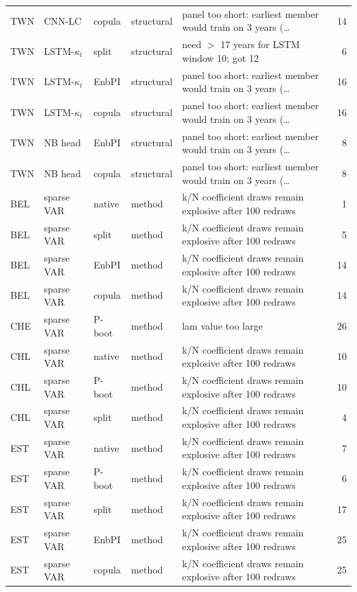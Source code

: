 {\begin{longtable}{@{}lllp{1.6cm}p{6.2cm}r@{}}
TWN & CNN-LC & copula & structural & panel too short: earliest member would train on 3 years (\ldots & 14 \\
TWN & LSTM-$\kappa_t$ & split & structural & need $>$ 17 years for LSTM window 10; got 12 & 6 \\
TWN & LSTM-$\kappa_t$ & EnbPI & structural & panel too short: earliest member would train on 3 years (\ldots & 16 \\
TWN & LSTM-$\kappa_t$ & copula & structural & panel too short: earliest member would train on 3 years (\ldots & 16 \\
TWN & NB head & EnbPI & structural & panel too short: earliest member would train on 3 years (\ldots & 8 \\
TWN & NB head & copula & structural & panel too short: earliest member would train on 3 years (\ldots & 8 \\
BEL & sparse VAR & native & method & k/N coefficient draws remain explosive after 100 redraws & 1 \\
BEL & sparse VAR & split & method & k/N coefficient draws remain explosive after 100 redraws & 5 \\
BEL & sparse VAR & EnbPI & method & k/N coefficient draws remain explosive after 100 redraws & 14 \\
BEL & sparse VAR & copula & method & k/N coefficient draws remain explosive after 100 redraws & 14 \\
CHE & sparse VAR & P-boot & method & lam value too large & 26 \\
CHL & sparse VAR & native & method & k/N coefficient draws remain explosive after 100 redraws & 10 \\
CHL & sparse VAR & P-boot & method & k/N coefficient draws remain explosive after 100 redraws & 10 \\
CHL & sparse VAR & split & method & k/N coefficient draws remain explosive after 100 redraws & 4 \\
EST & sparse VAR & native & method & k/N coefficient draws remain explosive after 100 redraws & 7 \\
EST & sparse VAR & P-boot & method & k/N coefficient draws remain explosive after 100 redraws & 6 \\
EST & sparse VAR & split & method & k/N coefficient draws remain explosive after 100 redraws & 17 \\
EST & sparse VAR & EnbPI & method & k/N coefficient draws remain explosive after 100 redraws & 25 \\
EST & sparse VAR & copula & method & k/N coefficient draws remain explosive after 100 redraws & 25 \\

\end{longtable}}
